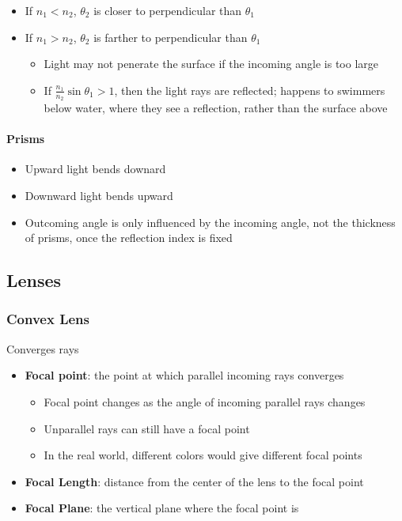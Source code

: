   \begin{itemize}
    \item If $ n_{1} < n_{2} $, $ \theta_{2} $ is closer to perpendicular than
    $ \theta_{1} $
    \item If $ n_{1} > n_{2} $, $ \theta_{2} $ is farther to perpendicular than
    $ \theta_{1} $
    \begin{itemize}
      \item Light may not penerate the surface if the incoming angle is too
      large
      \item If $ \frac{n_{1}}{n_{2}} \sin \theta_{1} > 1 $, then the light
      rays are reflected; happens to swimmers below water, where they see
      a reflection, rather than the surface above
    \end{itemize}
  \end{itemize}

  \paragraph{Prisms}
  \begin{itemize}
    \item Upward light bends downard
    \item Downward light bends upward
    \item Outcoming angle is only influenced by the incoming angle, not the
    thickness of prisms, once the reflection index is fixed
  \end{itemize}

\subsection{Lenses}

  \subsubsection{Convex Lens}

    Converges rays

    \begin{itemize}
      \item \textbf{Focal point}: the point at which parallel incoming rays
      converges
      \begin{itemize}
        \item Focal point changes as the angle of incoming parallel rays
        changes
        \item Unparallel rays can still have a focal point
        \item In the real world, different colors would give different
        focal points
      \end{itemize}

      \item \textbf{Focal Length}: distance from the center of the lens to
      the focal point
      \item \textbf{Focal Plane}: the vertical plane where the focal point is
    \end{itemize}


